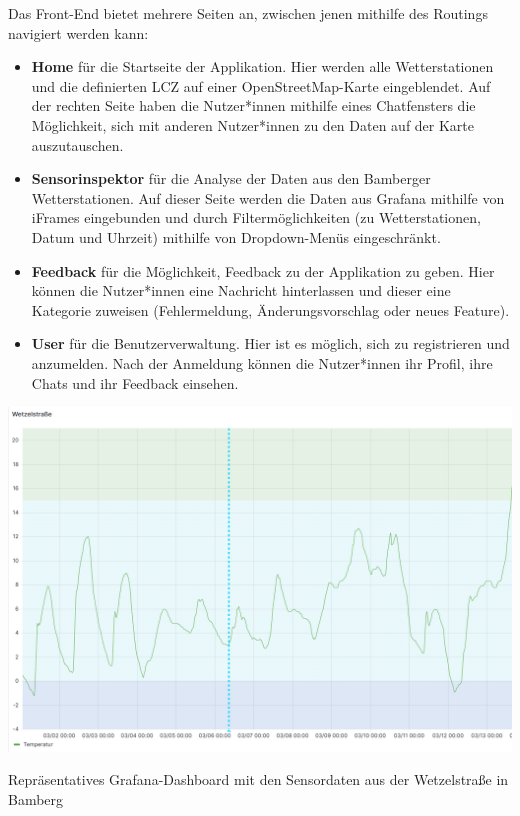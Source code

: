 Das Front-End bietet mehrere Seiten an, zwischen jenen mithilfe des Routings navigiert werden kann:

\begin{itemize}
    \item \textbf{Home} für die Startseite der Applikation. Hier werden alle Wetterstationen und die definierten \ac{LCZ} auf einer OpenStreetMap-Karte eingeblendet. Auf der rechten Seite haben die Nutzer*innen mithilfe eines Chatfensters die Möglichkeit, sich mit anderen Nutzer*innen zu den Daten auf der Karte auszutauschen.
    \item \textbf{Sensorinspektor} für die Analyse der Daten aus den Bamberger Wetterstationen. Auf dieser Seite werden die Daten aus Grafana mithilfe von iFrames eingebunden und durch Filtermöglichkeiten (zu Wetterstationen, Datum und Uhrzeit) mithilfe von Dropdown-Menüs eingeschränkt.
    \item \textbf{Feedback} für die Möglichkeit, Feedback zu der Applikation zu geben. Hier können die Nutzer*innen eine Nachricht hinterlassen und dieser eine Kategorie zuweisen (Fehlermeldung, Änderungsvorschlag oder neues Feature).
    \item \textbf{User} für die Benutzerverwaltung. Hier ist es möglich, sich zu registrieren und anzumelden. Nach der Anmeldung können die Nutzer*innen ihr Profil, ihre Chats und ihr Feedback einsehen.
\end{itemize}

\begin{marginfigure} %
    \centering
    \includegraphics[width=1\textwidth]{figures/grafana.png}
    \decoRule
    \caption[Grafana-Dashboard]{Repräsentatives Grafana-Dashboard mit den Sensordaten aus der Wetzelstraße in Bamberg}
    \label{fig:grafana}
\end{marginfigure}

